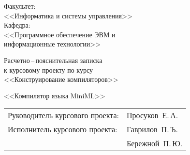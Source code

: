 \thispagestyle{fancy}


\vspace*{1cm}

\begin{flushright}
    \Large{ Факультет: }\\
    \large{ <<Информатика и системы управления>> }\\
    \Large{ Кафедра: }\\
    \large{ <<Программное обеспечение ЭВМ и\\ 
        информационные технологии>> }
\end{flushright}

\vspace{1cm}

\begin{LARGE} 
    \begin{center} 
        \begin{Large}
            Расчетно\,--\,пояснительная записка\\
            к курсовому проекту по курсу\\
            <<Конструирование компиляторов>>\\
        \end{Large}
        \vspace{2cm}
        <<Компилятор языка MiniML>>
    \end{center}
\end{LARGE}

\vspace{4cm}

\begin{flushright}
    \begin{tabular}{ll}
    Руководитель курсового проекта:&Просуков~Е.\,А.\\
    Исполнитель курсового проекта:&Гаврилов~П.\,Ъ.\\
                                  &Бережной~П.\,Ю.
    \end{tabular}
\end{flushright}

\newpage
\setcounter{page}{1}
